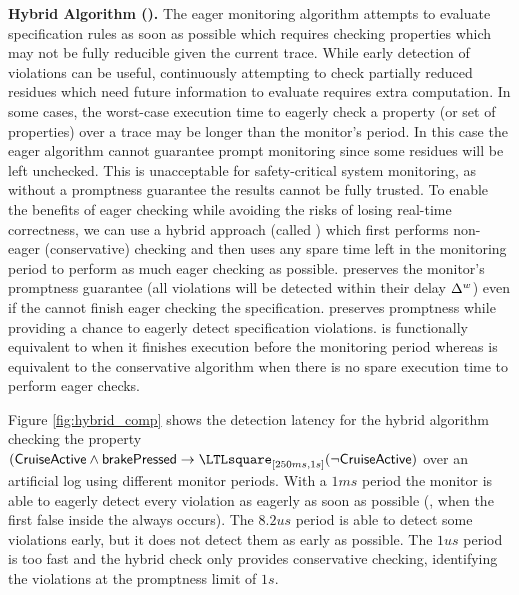 \noindent\textbf{Hybrid Algorithm (\ha).}
The eager monitoring algorithm attempts to evaluate specification rules as soon as possible
which requires checking properties which may not be fully reducible given the current trace.
While early detection of violations can be useful, continuously attempting to check
partially reduced residues which need future information to evaluate requires extra computation.
In some cases, the worst-case execution time to eagerly check a property (or set of properties)
over a trace may be longer than the monitor's period.
In this case the eager algorithm cannot guarantee prompt monitoring since some
residues will be left unchecked. This is unacceptable for
safety-critical system monitoring, as without a promptness guarantee the results cannot be fully trusted. 
%
To enable the benefits of eager checking while avoiding the risks of losing
real-time correctness, we can use a hybrid approach (called \ha) which first performs non-eager
(conservative) checking and then uses any spare time left in the monitoring period to
perform as much eager checking as possible.
\ha preserves the monitor's promptness guarantee (all violations will be
detected within their delay $\Delta^w$) even if the \monitor cannot finish eager
checking the specification.
\ha preserves promptness while providing a chance to eagerly detect specification violations.
\ha is functionally equivalent to \monitor when it finishes
execution before the monitoring period whereas \ha is
equivalent to the conservative algorithm when there is no spare execution time to perform eager checks.

Figure \ref{fig:hybrid_comp} shows the detection latency for the hybrid algorithm checking  the property $(\pred{CruiseActive} \wedge \pred{brakePressed} \rightarrow \henceforth_{[250ms, 1s]} (\neg \pred{CruiseActive})$ over an artificial log using different monitor periods. 
With a $1ms$ period the monitor is able to eagerly detect every violation as eagerly as soon as possible (\ie, when the first false inside the always occurs). 
The $8.2us$ period is able to detect some violations early, but it does not detect them as early as possible. 
The $1us$ period is too fast and the hybrid check only provides conservative checking, identifying the violations at the promptness limit of $1s$.

